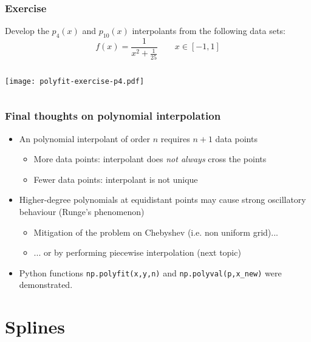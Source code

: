 \begin{frame}[fragile]
  \frametitle{Exercise}
  \footnotesize\selectfont
  Develop the $p_4(x)$ and $p_{10}(x)$ interpolants from the following data sets: 
  \vspace*{1em}
\[
f(x)=\frac{1}{x^2+\frac{1}{25}} \qquad x \in [-1,1]
\]\pause
\begin{columns}[T]

  \pause
  

    \pause\vspace*{-4em}
    \texttt{[image: polyfit-exercise-p4.pdf]}
\end{columns}
\end{frame}


\begin{frame}
  \frametitle{Final thoughts on polynomial interpolation}
  \begin{itemize}
     \item An polynomial interpolant of order $n$ requires $n+1$ data points
    \begin{itemize}
       \item More data points: interpolant does \emph{not always} cross the points
       \item Fewer data points: interpolant is not unique
    \end{itemize}
     \item Higher-degree polynomials at equidistant points may cause strong oscillatory behaviour (Runge's phenomenon)
    \begin{itemize}
       \item Mitigation of the problem on Chebyshev (i.e. non uniform grid)...
       \item ... or by performing piecewise interpolation (next topic)
    \end{itemize}
     \item Python functions \lstinline$np.polyfit(x,y,n)$ and \lstinline$np.polyval(p,x_new)$ were demonstrated.
  \end{itemize}
\end{frame}

\section{Splines}
